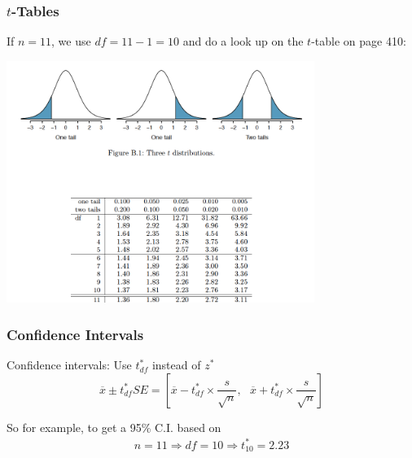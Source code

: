 \documentclass[handout]{beamer}
\newcommand{\xbar}{\overline{x}}
\begin{document}
\begin{frame}
\frametitle{$t$-Tables}
If $n=11$, we use $df=11-1=10$ and do a look up on the $t$-table on page 410:

\begin{center}
\includegraphics[width=0.75\textwidth]{figure/t.png}
\end{center}

\end{frame}


\begin{frame}
\frametitle{Confidence Intervals}

%
%
Confidence intervals:  Use $t^*_{df}$ instead of $z^*$
\[
\xbar \pm t_{df}^* SE = 
\left[
\overline{x} - t_{df}^* \times\frac{s}{\sqrt n}, \mbox{  }
\overline{x} + t_{df}^* \times\frac{s}{\sqrt n}
\right]
\]

So for example, to get a 95\% C.I. based on
\begin{eqnarray*}
n=11 \Rightarrow df=10 \Rightarrow t_{10}^*=2.23
\end{eqnarray*}

\end{frame}
\end{document}
